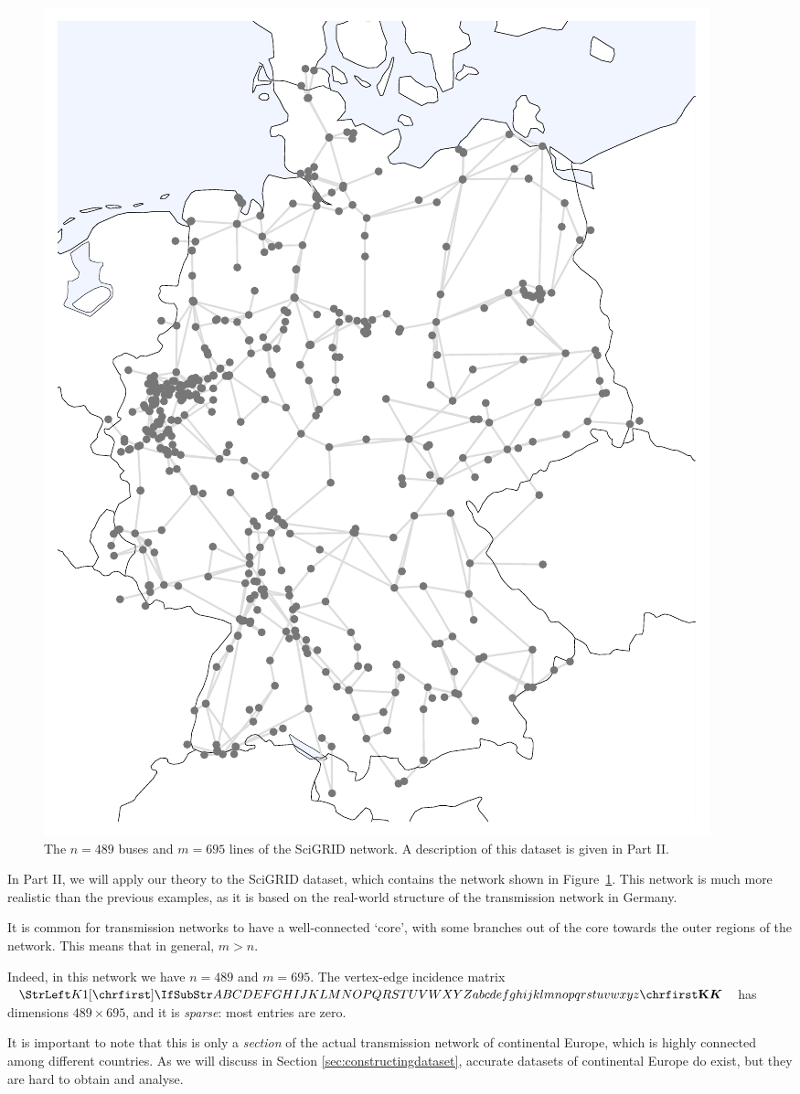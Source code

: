 \documentclass[main.tex]{subfiles}
\begin{document}
\begin{figure}
    \centering
    \includegraphics[width=.5\textwidth]{img/scigrid_boring.pdf}
    \caption{The $n=489$ buses and $m=695$ lines of the SciGRID network. A description of this dataset is given in Part II.}
    \label{fig:scigrid}
\end{figure}
\begin{example}\label{exa:scigridnetwork}
In Part II, we will apply our theory to the SciGRID dataset, which contains the network shown in Figure~\ref{fig:scigrid}. This network is much more realistic than the previous examples, as it is based on the real-world structure of the transmission network in Germany. 

It is common for transmission networks to have a well-connected `core', with some branches out of the core towards the outer regions of the network. This means that in general, $m>n$.

Indeed, in this network we have $n=489$ and $m=695$. The vertex-edge incidence matrix $\mat{K}$ has dimensions $489 \times 695$, and it is \emph{sparse}: most entries are zero.

It is important to note that this is only a \emph{section} of the actual transmission network of continental Europe, which is highly connected among different countries. As we will discuss in Section \ref{sec:constructingdataset}, accurate datasets of continental Europe do exist, but they are hard to obtain and analyse.
\end{example}
\end{document}
